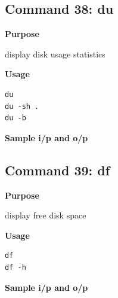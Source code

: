 \documentclass{article}
\begin{document}
\subsection{Command 38: du} 
\textbf{Purpose}
\begin{flushleft}
 display disk usage statistics
\end{flushleft}
\textbf{Usage}
\begin{verbatim}
du
du -sh .
du -b
\end{verbatim}
\textbf{Sample i/p and o/p}
\begin{figure}[H] 
\end{figure}
\subsection{Command 39: df} 
\textbf{Purpose}
\begin{flushleft}
 display free disk space
\end{flushleft}
\textbf{Usage}
\begin{verbatim}
df
df -h
\end{verbatim}
\textbf{Sample i/p and o/p}
\begin{figure}[H] 
\end{figure}
\end{document}

